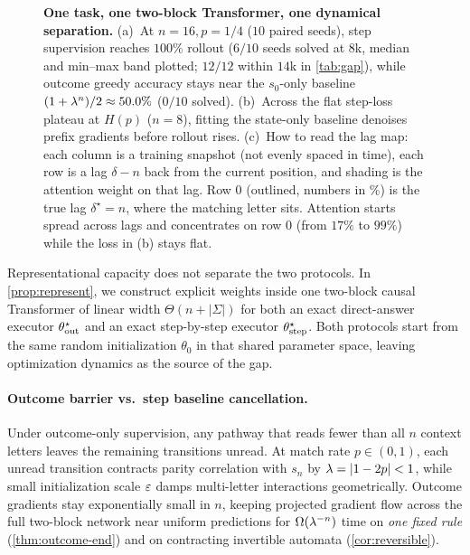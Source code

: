 \begin{figure}[t]
\centering
\resizebox{\linewidth}{!}{}
\caption{\textbf{One task, one two-block Transformer, one dynamical separation.} (a)~At $n=16, p=1/4$ ($10$ paired seeds), step supervision reaches $100\%$ rollout ($6/10$ seeds solved at $8$k, median and min--max band plotted; $12/12$ within $14$k in \cref{tab:gap}), while outcome greedy accuracy stays near the $s_0$-only baseline $(1+\lambda^n)/2 \approx 50.0\%$ ($0/10$ solved). (b)~Across the flat step-loss plateau at $H(p)$ ($n=8$), fitting the state-only baseline denoises prefix gradients before rollout rises. (c)~How to read the lag map: each column is a training snapshot (not evenly spaced in time), each row is a lag $\delta - n$ back from the current position, and shading is the attention weight on that lag. Row $0$ (outlined, numbers in \%) is the true lag $\delta^\star = n$, where the matching letter sits. Attention starts spread across lags and concentrates on row $0$ (from $17\%$ to $99\%$) while the loss in (b) stays flat.}
\label{fig:overview}
\end{figure}

Representational capacity does not separate the two protocols. In \cref{prop:represent}, we construct explicit weights inside one two-block causal Transformer of linear width $\Theta(n + |\Sigma|)$ for both an exact direct-answer executor $\theta^\star_{\mathrm{out}}$ and an exact step-by-step executor $\theta^\star_{\mathrm{step}}$. Both protocols start from the same random initialization $\theta_0$ in that shared parameter space, leaving optimization dynamics as the source of the gap.

\par\smallskip
\noindent{}\par\smallskip

\paragraph{Outcome barrier vs.\ step baseline cancellation.}
Under outcome-only supervision, any pathway that reads fewer than all $n$ context letters leaves the remaining transitions unread. At match rate $p \in (0,1)$, each unread transition contracts parity correlation with $s_n$ by $\lambda = |1 - 2p| < 1$, while small initialization scale $\varepsilon$ damps multi-letter interactions geometrically. Outcome gradients stay exponentially small in $n$, keeping projected gradient flow across the full two-block network near uniform predictions for $\Omega(\lambda^{-n})$ time on \emph{one fixed rule} (\cref{thm:outcome-end}) and on contracting invertible automata (\cref{cor:reversible}).

